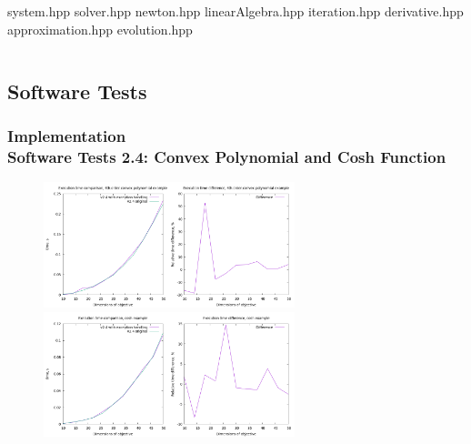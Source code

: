 \documentclass[ucs,10pt]{beamer}
\begin{document}
\begin{frame}
\begin{columns}
\begin{column}{0.5\textwidth}
                 	    system.hpp \newline
                 	    solver.hpp \newline
                  	    newton.hpp \newline
                 	  linearAlgebra.hpp \newline
               	 	  iteration.hpp \newline
                 	  derivative.hpp \newline
                 	  approximation.hpp \newline
		 	  evolution.hpp \newline
     		\end{column}
	\end{columns}
\end{frame}


\subsection{Software Tests}

\begin{frame}
\frametitle{Implementation \\
	\small \color{rwth-blue} Software Tests 2.4: Convex Polynomial and Cosh Function}

	\begin{figure}
		\centering
		\includegraphics[width=0.65\textwidth]{figures/2.4_4th_order_convex_polynomial.png}
		\vspace{0.3cm}
		\includegraphics[width=0.65\textwidth]{figures/2.4_cosh.png}
	\end{figure}
\end{frame}
\end{document}

